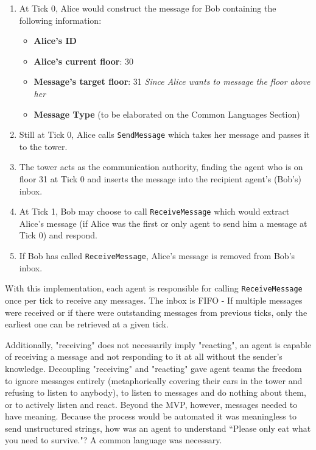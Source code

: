 \begin{enumerate}
    \item At Tick 0, Alice would construct the message for Bob containing the following information:
        \begin{itemize}
            \item \textbf{Alice's ID}
            \item \textbf{Alice's current floor}: 30
            \item \textbf{Message's target floor}: 31 \textit{Since Alice wants to message the floor above her}
            \item \textbf{Message Type} (to be elaborated on the Common Languages Section)
        \end{itemize}
    \item Still at Tick 0, Alice calls \texttt{SendMessage} which takes her message and passes it to the tower.
    \item The tower acts as the communication authority, finding the agent who is on floor 31 at Tick 0 and inserts the message into the recipient agent's (Bob's) inbox.
    \item At Tick 1, Bob may choose to call \texttt{ReceiveMessage} which would extract Alice's message (if Alice was the first or only agent to send him a message at Tick 0) and respond.
    \item If Bob has called \texttt{ReceiveMessage}, Alice's message is removed from Bob's inbox.
\end{enumerate}
With this implementation, each agent is responsible for calling \texttt{ReceiveMessage} once per tick to receive any messages. The inbox is FIFO - If multiple messages were received or if there were outstanding messages from previous ticks, only the earliest one can be retrieved at a given tick.

Additionally, "receiving" does not necessarily imply "reacting", an agent is capable of receiving a message and not responding to it at all without the sender's knowledge. Decoupling "receiving" and "reacting" gave agent teams the freedom to ignore messages entirely (metaphorically covering their ears in the tower and refusing to listen to anybody), to listen to messages and do nothing about them, or to actively listen and react. \newline
Beyond the MVP, however, messages needed to have meaning. Because the process would be automated it was meaningless to send unstructured strings, how was an agent to understand ``Please only eat what you need to survive."? \newline
A common language was necessary.

